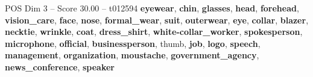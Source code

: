 \begin{textsample}{POS Dim 3 – Score 30.00 – t012594}  \label{ex:f3_pos_032}
\textbf{eyewear}, \textbf{chin}, \textbf{glasses}, \textbf{head}, \textbf{forehead}, \textbf{vision\_care}, \textbf{face}, \textbf{nose}, \textbf{formal\_wear}, \textbf{suit}, \textbf{outerwear}, \textbf{eye}, \textbf{collar}, \textbf{blazer}, \textbf{necktie}, \textbf{wrinkle}, \textbf{coat}, \textbf{dress\_shirt}, \textbf{white-collar\_worker}, \textbf{spokesperson}, \textbf{microphone}, \textbf{official}, \textbf{businessperson}, thumb, \textbf{job}, \textbf{logo}, \textbf{speech}, \textbf{management}, \textbf{organization}, \textbf{moustache}, \textbf{government\_agency}, \textbf{news\_conference}, \textbf{speaker}

\end{textsample}

